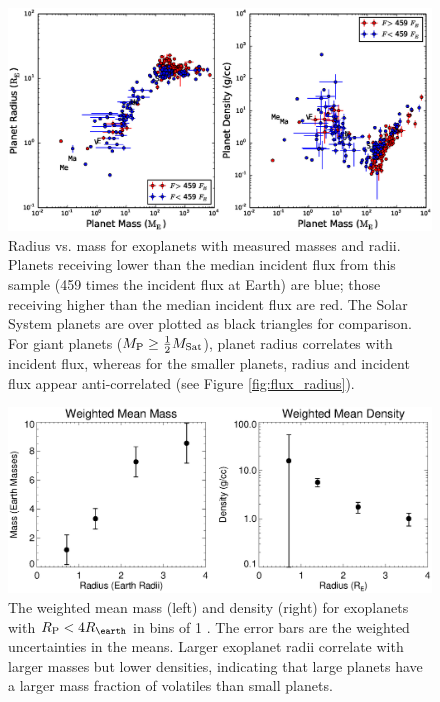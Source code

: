 \documentclass[11pt]{aastex}
\newcommand{\rspecial}{4 \rearth}
\begin{document}
\clearpage
\begin{figure}[htbp] %
   \centering
   \includegraphics[width=6in]{mrf.eps} 
   \caption{Radius vs. mass for exoplanets with measured masses and radii.  Planets receiving lower than the median incident flux from this sample (459 times the incident flux at Earth) are blue; those receiving higher than the median incident flux are red.  The Solar System planets are over plotted as black triangles for comparison.  For giant planets ($M_{\rm P} \geq \frac{1}{2} M_{\mathrm{Sat}}$), planet radius correlates with incident flux, whereas for the smaller planets, radius and incident flux appear anti-correlated (see Figure \ref{fig:flux_radius}).}
   \label{fig:mrf}
\end{figure}

\begin{figure}[htbp] %
   \centering
    \includegraphics[width=6in]{mr_bin.eps} 
   \caption{The weighted mean mass (left) and density (right) for exoplanets with $\rpl < \rspecial$ in bins of 1 \rearth.  The error bars are the weighted uncertainties in the means.  Larger exoplanet radii correlate with larger masses but lower densities, indicating that large planets have a larger mass fraction of volatiles than small planets.}
   \label{fig:rbin}
\end{figure}
\end{document}
